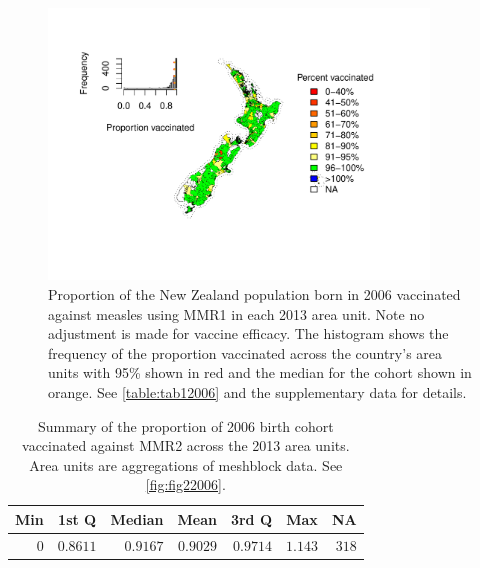 \documentclass{article}
\begin{document}
\begin{figure}
   \begin{center}
    \includegraphics[width=0.9\textwidth]{nir_census_MMR1_NIR_2006.pdf}
    \end{center}
    \caption{Proportion of the New Zealand population born in 2006 vaccinated against measles using MMR1 in each 2013 area unit. Note no adjustment is made for vaccine efficacy. The histogram shows the frequency of the proportion vaccinated across the country's area units with 95\% shown in red and the median for the cohort shown in orange. See \autoref{table:tab12006} and the supplementary data for details.}
\label{fig:fig12006}
\end{figure}

 \vspace{5mm} %
\begin{table}
\begin{center}
\begin{tabular}{rrrrrrr}
\hline\hline
\multicolumn{1}{c}{Min}&\multicolumn{1}{c}{1st Q}&\multicolumn{1}{c}{Median}&\multicolumn{1}{c}{Mean}&\multicolumn{1}{c}{3rd Q}&\multicolumn{1}{c}{Max}&\multicolumn{1}{c}{NA}\tabularnewline
\hline
$0$&$0.8611$&$0.9167$&$0.9029$&$0.9714$&$1.143$&$318$\tabularnewline
\hline
\end{tabular}\end{center}\caption{Summary of the proportion of 2006 birth cohort vaccinated against MMR2 across the 2013 area units. Area units are aggregations of meshblock data. See \autoref{fig:fig22006}.}
\label{table:tab22006}
\end{table}
\end{document}
